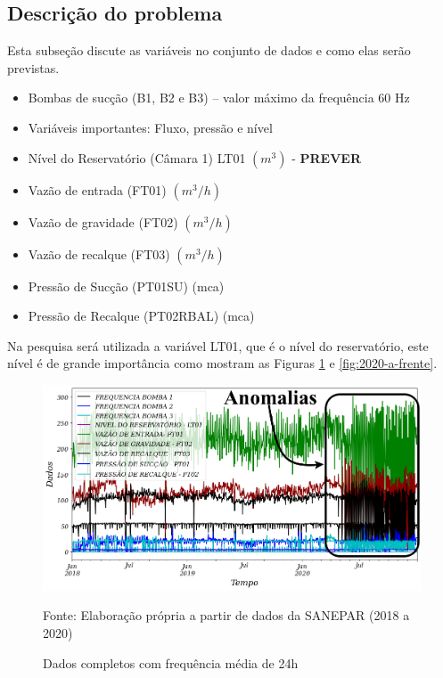 \subsection{Descri\c c\~ao do problema} \label{subsec:descricao}

Esta subseção discute as variáveis no conjunto de dados e como elas serão previstas.

\begin{itemize}
\item Bombas de sucção (B1, B2 e B3) – valor máximo da frequência 60 Hz

\item[] Variáveis importantes: Fluxo, pressão e nível

\item Nível do Reservatório (Câmara 1) LT01 $ (m^3) $ - \textbf{PREVER}

\item Vazão de entrada (FT01) $ (m^3/h) $

\item Vazão de gravidade (FT02) $ (m^3/h) $

\item Vazão de recalque (FT03) $ (m^3/h) $

\item Pressão de Sucção (PT01SU) (mca)

\item Pressão de Recalque (PT02RBAL) (mca)
\end{itemize}

Na pesquisa será utilizada a variável LT01, que é o nível do reservatório, este nível é de grande importância como mostram as Figuras \ref{fig:dados-todos} e \ref{fig:2020-a-frente}. 



\begin{figure}[H]
	\centering
	\caption{Dados completos com frequência média de 24h}
	\label{fig:dados-todos}
	\includegraphics[width=1\linewidth]{"Introducao/Figuras/dados todos"}
	
	Fonte: Elaboração própria a partir de dados da SANEPAR (2018 a 2020)
\end{figure}

